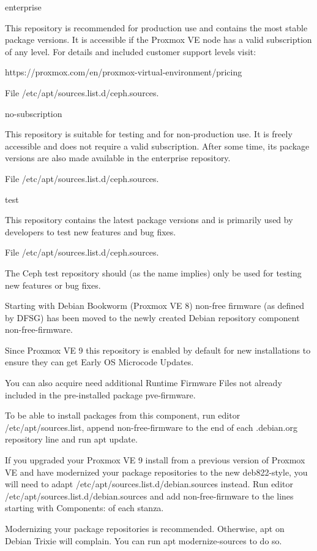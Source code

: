 enterprise

This repository is recommended for production use and contains the most stable package versions. It is accessible if the Proxmox VE node has a valid subscription of any level. For details and included customer support levels visit:

https://proxmox.com/en/proxmox-virtual-environment/pricing

File /etc/apt/sources.list.d/ceph.sources.

no-subscription

This repository is suitable for testing and for non-production use. It is freely accessible and does not require a valid subscription. After some time, its package versions are also made available in the enterprise repository.

File /etc/apt/sources.list.d/ceph.sources.

test

This repository contains the latest package versions and is primarily used by developers to test new features and bug fixes.

File /etc/apt/sources.list.d/ceph.sources.

The Ceph test repository should (as the name implies) only be used for testing new features or bug fixes.

Starting with Debian Bookworm (Proxmox VE 8) non-free firmware (as defined by DFSG) has been moved to the newly created Debian repository component non-free-firmware.

Since Proxmox VE 9 this repository is enabled by default for new installations to ensure they can get Early OS Microcode Updates.

You can also acquire need additional Runtime Firmware Files not already included in the pre-installed package pve-firmware.

To be able to install packages from this component, run editor /etc/apt/sources.list, append non-free-firmware to the end of each .debian.org repository line and run apt update.

If you upgraded your Proxmox VE 9 install from a previous version of Proxmox VE and have modernized your package repositories to the new deb822-style, you will need to adapt /etc/apt/sources.list.d/debian.sources instead. Run editor /etc/apt/sources.list.d/debian.sources and add non-free-firmware to the lines starting with Components: of each stanza.

Modernizing your package repositories is recommended. Otherwise, apt on Debian Trixie will complain. You can run apt modernize-sources to do so.

